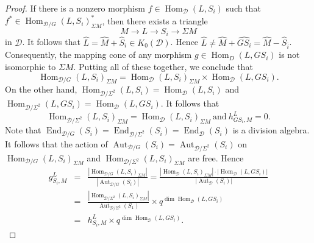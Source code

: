 \documentclass[12pt,reqno]{amsart}
\numberwithin{equation}{section}
\newcommand{\Cone}{\operatorname{cone}\nolimits}
\newcommand{\Aut}{\operatorname{Aut}\nolimits}
\newcommand{\End}{\operatorname{End}\nolimits}
\newcommand{\Hom}{\operatorname{Hom}\nolimits}
\renewcommand{\dim}{\operatorname{dim}\nolimits}
\newcommand{\go}{{K_0}}
\begin{document}
\begin{proof}
		
		If there is a nonzero morphism $f\in\Hom_{\mathcal{D}}(L,S_i)$ such that $f^\ast\in \Hom_{\mathcal{D}/G}(L,S_i)^\ast_{\Sigma M}$, then there exists a triangle
		\[
		M\longrightarrow L\longrightarrow S_i\longrightarrow \Sigma M
		\]
		in $\mathcal{D}$. It follows that $\hat{L}=\hat{M}+\hat{S}_i\in \go(\mathcal{D})$. Hence $\hat{L}\neq \hat{M}+\hat{GS_i}=\hat{M}-\hat{S}_{\bar{i}}$. Consequently, the mapping cone of any morphism $g\in \Hom_{D}(L, GS_i)$ is not isomorphic to $\Sigma M$. Putting all of these together, we conclude that
		\[
		\Hom_{\mathcal{D}/G}(L,S_i)_{\Sigma M}=\Hom_{\mathcal{D}}(L,S_i)_{\Sigma M}\times \Hom_{\mathcal{D}}(L,GS_i).
		\]
		On the other hand, $\Hom_{\mathcal{D}/\Sigma^2}(L,S_i)=\Hom_{\mathcal{D}}(L,S_i)$ and $\Hom_{\mathcal{D}/\Sigma^2}(L,GS_i)=\Hom_{\mathcal{D}}(L,GS_i)$. It follows that 
		\[\Hom_{\mathcal{D}/\Sigma^2}(L,S_i)_{\Sigma M}=\Hom_{\mathcal{D}}(L,S_i)_{\Sigma M}\ \text{and}\ h_{GS_i,M}^L=0.
		\]
		Note that $\End_{\mathcal{D}/G}(S_i)=\End_{\mathcal{D}/\Sigma^2}(S_i)=\End_{\mathcal{D}}(S_i)$ is a division algebra. It follows that the action of $\Aut_{\mathcal{D}/G}(S_i)=\Aut_{\mathcal{D}/\Sigma^2}(S_i)$ on $\Hom_{\mathcal{D}/G}(L,S_i)_{\Sigma M}$ and $\Hom_{\mathcal{D}/\Sigma^2}(L,S_i)_{\Sigma M}$ are free. Hence
		\begin{eqnarray*}
			g_{S_i,M}^L&=&\frac{|\Hom_{\mathcal{D}/G}(L,S_i)_{\Sigma M}|}{|\Aut_{\mathcal{D}/G}(S_i)|}=\frac{|\Hom_{\mathcal{D}}(L,S_i)_{\Sigma M}|\cdot |\Hom_{\mathcal{D}}(L,GS_i)|}{|\Aut_{\mathcal{D}}(S_i)|}\\
			&=&\frac{|\Hom_{\mathcal{D}/\Sigma^2}(L,S_i)_{\Sigma M}|}{\Aut_{\mathcal{D}/\Sigma^2}(S_1)}\times q^{\dim \Hom_{\mathcal{D}}(L,GS_i)}\\
			&=&h_{S_i,M}^L\times q^{\dim \Hom_{\mathcal{D}}(L,GS_i)}.
		\end{eqnarray*}
		

\end{proof}
\end{document}
